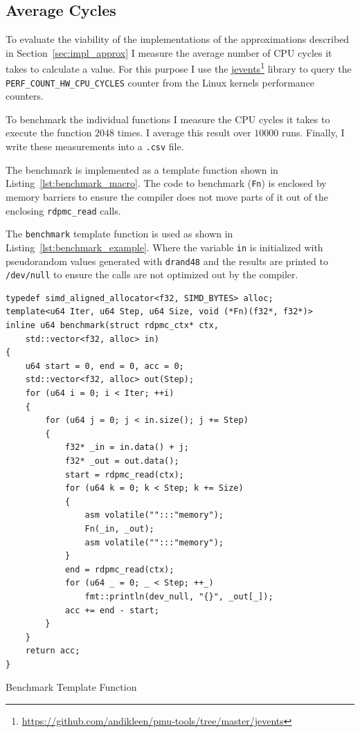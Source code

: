 \documentclass[a4paper, 11pt]{memoir}
\begin{document}
    \subsection{Average Cycles}
    \label{sec:expr_average_cycles}
    To evaluate the viability of the implementations of the approximations described in Section~\ref{sec:impl_approx} I
    measure the average number of CPU cycles it takes to calculate a value. For this purpose I use the
    \href{https://github.com/andikleen/pmu-tools/tree/master/jevents}{jevents}\footnote{\href{https://github.com/andikleen/pmu-tools/tree/master/jevents}{https://github.com/andikleen/pmu-tools/tree/master/jevents}}
    library to query the \texttt{PERF_COUNT_HW_CPU_CYCLES} counter from the Linux kernels performance counters.

    To benchmark the individual functions I measure the CPU cycles it takes to execute the function $2048$ times. I average
    this result over $10000$ runs. Finally, I write these measurements into a \texttt{.csv} file.

    The benchmark is implemented as a template function shown in Listing~\ref{lst:benchmark_macro}. The code to benchmark
    (\texttt{Fn}) is enclosed by memory barriers to ensure the compiler does not move parts of it out of the
    enclosing \texttt{rdpmc_read} calls.

    The \texttt{benchmark} template function is used as shown in Listing~\ref{lst:benchmark_example}. Where the variable
    \texttt{in} is initialized with pseudorandom values generated with \texttt{drand48} and the results
    are printed to \texttt{/dev/null} to ensure the calls are not optimized out by the compiler.

    \begin{listing}[t]
        \begin{verbatim}
typedef simd_aligned_allocator<f32, SIMD_BYTES> alloc;
template<u64 Iter, u64 Step, u64 Size, void (*Fn)(f32*, f32*)>
inline u64 benchmark(struct rdpmc_ctx* ctx,
    std::vector<f32, alloc> in)
{
    u64 start = 0, end = 0, acc = 0;
    std::vector<f32, alloc> out(Step);
    for (u64 i = 0; i < Iter; ++i)
    {
        for (u64 j = 0; j < in.size(); j += Step)
        {
            f32* _in = in.data() + j;
            f32* _out = out.data();
            start = rdpmc_read(ctx);
            for (u64 k = 0; k < Step; k += Size)
            {
                asm volatile("":::"memory");
                Fn(_in, _out);
                asm volatile("":::"memory");
            }
            end = rdpmc_read(ctx);
            for (u64 _ = 0; _ < Step; ++_)
                fmt::println(dev_null, "{}", _out[_]);
            acc += end - start;
        }
    }
    return acc;
}
        \end{verbatim}
        \caption{Benchmark Template Function}
        \label{lst:benchmark_macro}
    \end{listing}
\end{document}
